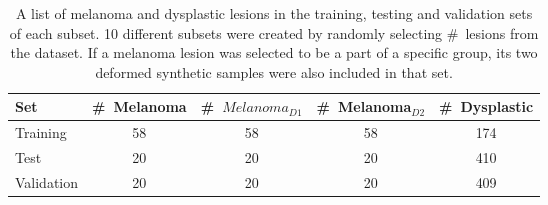 \begin{table}[t]
\caption[A list of melanoma and dysplastic lesions in the \ac{dos}-balanced training, Experiment~\#2]{
	A list of melanoma and dysplastic lesions in the training, testing and validation sets of each subset. 
	10 different subsets were created by randomly selecting \#~lesions from the dataset. 
	If a melanoma lesion was selected to be a part of a specific group, its two deformed synthetic samples were also included in that set.}
\label{tab:Exp2TTVlist}
\medskip
\centering	
\footnotesize{
\begin{tabularx}{0.8\linewidth}{l	cccc}
\toprule
Set & \#~Melanoma & \#~$Melanoma_{D1}$ & \#~Melanoma$_{D2}$ & \#~Dysplastic\\
\midrule
Training & 58  & 58 & 58 & 174 \\
Test & 20 & 20 & 20 & 410 \\
Validation & 20 &  20 & 20 & 409 \\  
  \bottomrule
  \end{tabularx}
  }
\end{table}
